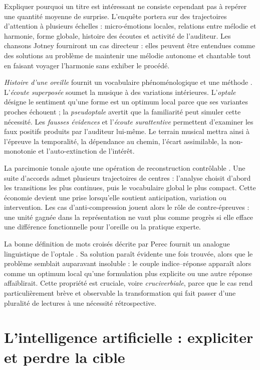 \documentclass[11pt,a4paper]{article}
\begin{document}
Expliquer pourquoi un titre est intéressant ne consiste cependant pas à repérer
une quantité moyenne de surprise. L'enquête portera sur des trajectoires
d'attention à plusieurs échelles : micro-émotions locales, relations entre
mélodie et harmonie, forme globale, histoire des écoutes et activité de
l'auditeur. Les chansons Jotney fourniront un cas directeur : elles peuvent être
entendues comme des solutions au problème de maintenir une mélodie autonome et
chantable tout en faisant voyager l'harmonie sans exhiber le procédé.

\emph{Histoire d'une oreille} fournit un vocabulaire phénoménologique et une
méthode \parencite{pachet2018oreille}. L'\emph{écoute superposée} soumet la
musique à des variations intérieures. L'\emph{optale} désigne le sentiment
qu'une forme est un optimum local parce que ses variantes proches échouent ; la
\emph{pseudoptale} avertit que la familiarité peut simuler cette nécessité. Les
\emph{fausses évidences} et l'\emph{écoute surattentive} permettent d'examiner
les faux positifs produits par l'auditeur lui-même. Le terrain musical mettra
ainsi à l'épreuve la temporalité, la dépendance au chemin, l'écart assimilable,
la non-monotonie et l'auto-extinction de l'intérêt.

La parcimonie tonale ajoute une opération de reconstruction contrôlable
\parencite{pachet2026tonalparsimony}. Une suite d'accords admet plusieurs
trajectoires de centres : l'analyse choisit d'abord les transitions les plus
continues, puis le vocabulaire global le plus compact. Cette économie devient
une prise lorsqu'elle soutient anticipation, variation ou intervention. Les cas
d'anti-compression jouent alors le rôle de contre-épreuves : une unité gagnée
dans la représentation ne vaut plus comme progrès si elle efface une différence
fonctionnelle pour l'oreille ou la pratique experte.

La bonne définition de mots croisés décrite par Perec fournit un analogue
linguistique de l'optale \parencite{perec1999motscroises}. Sa solution paraît
évidente une fois trouvée, alors que le problème semblait auparavant insoluble : le
couple indice--réponse apparaît alors comme un optimum local qu'une formulation
plus explicite ou une autre réponse affaiblirait. Cette propriété est cruciale,
voire \emph{cruciverbiale}, parce que le cas rend particulièrement brève et
observable la transformation qui fait passer d'une pluralité de lectures à une
nécessité rétrospective.

\section{L'intelligence artificielle : expliciter et perdre la cible}
\end{document}

